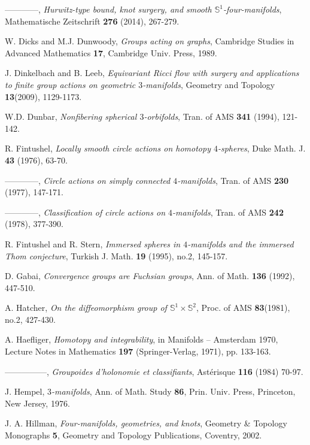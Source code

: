 \documentclass[11pt]{amsart}
\theoremstyle{plain}
\numberwithin{theorem}{section}
\theoremstyle{definition}
\begin{document}
\begin{thebibliography}{}
 ------------, {\em Hurwitz-type bound, knot surgery, and smooth ${{\mathbb S}}^1$-four-manifolds},
 Mathematische Zeitschrift {\bf 276} (2014), 267-279.

 W. Dicks and M.J. Dunwoody, {\em Groups acting on graphs}, Cambridge Studies in 
Advanced  Mathematics {\bf 17}, Cambridge Univ. Press,   1989.   

 J. Dinkelbach and B. Leeb, {\em Equivariant Ricci flow with surgery and applications 
to finite group actions on geometric $3$-manifolds}, Geometry and Topology {\bf 13}(2009), 1129-1173.

 W.D. Dunbar, {\em Nonfibering spherical $3$-orbifolds},  
Tran. of AMS {\bf 341} (1994), 121-142.      

 R. Fintushel, {\em Locally smooth circle actions on homotopy $4$-spheres}, 
Duke Math. J. {\bf 43} (1976), 63-70.

 ------------, {\em Circle actions on simply connected 
               $4$-manifolds}, Tran. of AMS {\bf 230} (1977), 147-171.

 ------------, {\em Classification of circle actions on
                $4$-manifolds}, Tran. of AMS {\bf 242} (1978), 377-390.
                
 R. Fintushel and R. Stern, {\em Immersed spheres in $4$-manifolds and the immersed
Thom conjecture}, Turkish J. Math. {\bf 19} (1995), no.2, 145-157.
                
 D. Gabai, {\em Convergence groups are Fuchsian groups}, 
 Ann. of Math. {\bf 136} (1992), 447-510.
 
 A. Hatcher, {\em On the diffeomorphism group of ${{\mathbb S}}^1\times {{\mathbb S}}^2$}, Proc. of AMS {\bf 83}(1981), no.2, 427-430. 

 A. Haefliger, {\em Homotopy and integrability}, in Manifolds -- Amsterdam 1970, 
Lecture Notes in Mathematics {\bf 197} (Springer-Verlag, 1971), pp. 133-163.

 ---------------, {\em Groupoides d'holonomie et classifiants}, Ast\'{e}risque 
{\bf 116} (1984) 70-97.
                       
 J. Hempel, {\em $3$-manifolds}, Ann. of Math. Study {\bf 86},
               Prin. Univ. Press, Princeton, New Jersey, 1976.         
               
 J. A. Hillman, {\em Four-manifolds, geometries, and knots}, Geometry \& Topology 
Monographs {\bf 5}, Geometry and Topology Publications, Coventry, 2002.       


\end{thebibliography}
\end{document}
